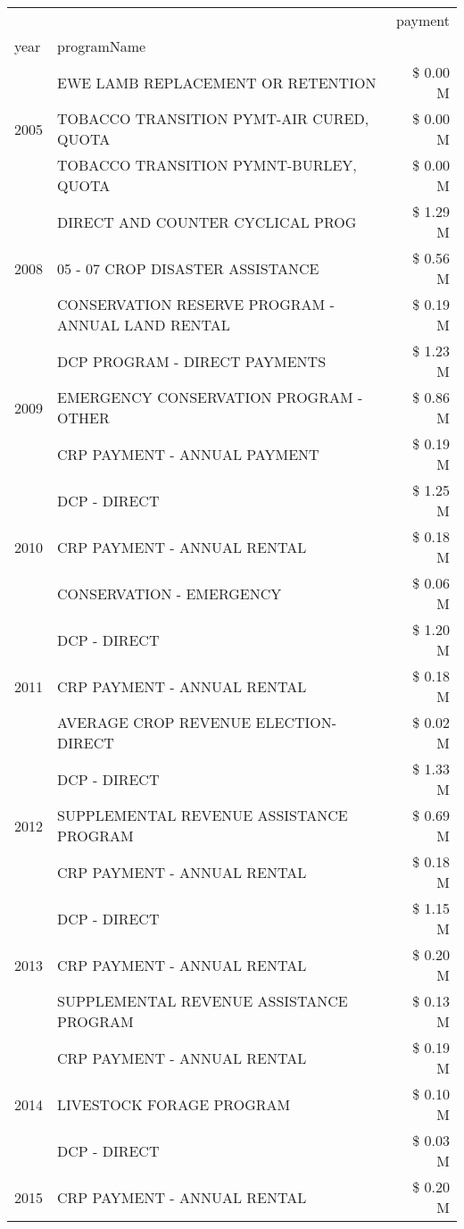 \begin{tabular}{llr}
\toprule
 &  & payment \\
year & programName &  \\
\midrule
\multirow[t]{3}{*}{2005} & EWE LAMB REPLACEMENT OR RETENTION & \$ 0.00 M \\
 & TOBACCO TRANSITION PYMT-AIR CURED, QUOTA & \$ 0.00 M \\
 & TOBACCO TRANSITION PYMNT-BURLEY, QUOTA & \$ 0.00 M \\
\cline{1-3}
\multirow[t]{3}{*}{2008} & DIRECT AND COUNTER CYCLICAL PROG & \$ 1.29 M \\
 & 05 - 07 CROP DISASTER ASSISTANCE & \$ 0.56 M \\
 & CONSERVATION RESERVE PROGRAM - ANNUAL LAND RENTAL & \$ 0.19 M \\
\cline{1-3}
\multirow[t]{3}{*}{2009} & DCP PROGRAM - DIRECT PAYMENTS & \$ 1.23 M \\
 & EMERGENCY CONSERVATION PROGRAM - OTHER & \$ 0.86 M \\
 & CRP PAYMENT - ANNUAL PAYMENT & \$ 0.19 M \\
\cline{1-3}
\multirow[t]{3}{*}{2010} & DCP - DIRECT & \$ 1.25 M \\
 & CRP PAYMENT - ANNUAL RENTAL & \$ 0.18 M \\
 & CONSERVATION - EMERGENCY & \$ 0.06 M \\
\cline{1-3}
\multirow[t]{3}{*}{2011} & DCP - DIRECT & \$ 1.20 M \\
 & CRP PAYMENT - ANNUAL RENTAL & \$ 0.18 M \\
 & AVERAGE CROP REVENUE ELECTION-DIRECT & \$ 0.02 M \\
\cline{1-3}
\multirow[t]{3}{*}{2012} & DCP - DIRECT & \$ 1.33 M \\
 & SUPPLEMENTAL REVENUE ASSISTANCE PROGRAM & \$ 0.69 M \\
 & CRP PAYMENT - ANNUAL RENTAL & \$ 0.18 M \\
\cline{1-3}
\multirow[t]{3}{*}{2013} & DCP - DIRECT & \$ 1.15 M \\
 & CRP PAYMENT - ANNUAL RENTAL & \$ 0.20 M \\
 & SUPPLEMENTAL REVENUE ASSISTANCE PROGRAM & \$ 0.13 M \\
\cline{1-3}
\multirow[t]{3}{*}{2014} & CRP PAYMENT - ANNUAL RENTAL & \$ 0.19 M \\
 & LIVESTOCK FORAGE PROGRAM & \$ 0.10 M \\
 & DCP - DIRECT & \$ 0.03 M \\
\cline{1-3}
\multirow[t]{3}{*}{2015} & CRP PAYMENT - ANNUAL RENTAL & \$ 0.20 M \\

\end{tabular}
